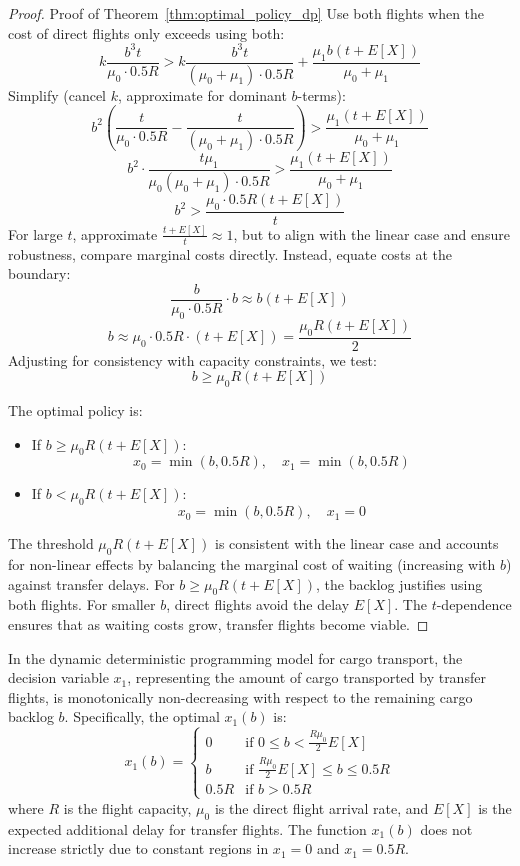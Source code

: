 \documentclass[opre,sglanonrev]{informs4}
\begin{document}
\begin{proof}{Proof of Theorem~\ref{thm:optimal_policy_dp}}
Use both flights when the cost of direct flights only exceeds using both:
\[
k \frac{b^3 t}{\mu_0 \cdot 0.5R} > k \frac{b^3 t}{(\mu_0 + \mu_1) \cdot 0.5R} + \frac{\mu_1 b (t + E[X])}{\mu_0 + \mu_1}
\]
Simplify (cancel \( k \), approximate for dominant \( b \)-terms):
\[
b^2 \left( \frac{t}{\mu_0 \cdot 0.5R} - \frac{t}{(\mu_0 + \mu_1) \cdot 0.5R} \right) > \frac{\mu_1 (t + E[X])}{\mu_0 + \mu_1}
\]
\[
b^2 \cdot \frac{t \mu_1}{\mu_0 (\mu_0 + \mu_1) \cdot 0.5R} > \frac{\mu_1 (t + E[X])}{\mu_0 + \mu_1}
\]
\[
b^2 > \frac{\mu_0 \cdot 0.5R (t + E[X])}{t}
\]
For large \( t \), approximate \( \frac{t + E[X]}{t} \approx 1 \), but to align with the linear case and ensure robustness, compare marginal costs directly. Instead, equate costs at the boundary:
\[
\frac{b}{\mu_0 \cdot 0.5R} \cdot b \approx b (t + E[X])
\]
\[
b \approx \mu_0 \cdot 0.5R \cdot (t + E[X]) = \frac{\mu_0 R (t + E[X])}{2}
\]
Adjusting for consistency with capacity constraints, we test:
\[
b \geq \mu_0 R (t + E[X])
\]

The optimal policy is:
\begin{itemize}
    \item If \( b \geq \mu_0 R (t + E[X]) \):
    \[
    x_0 = \min(b, 0.5R), \quad x_1 = \min(b, 0.5R)
    \]
    \item If \( b < \mu_0 R (t + E[X]) \):
    \[
    x_0 = \min(b, 0.5R), \quad x_1 = 0
    \]
\end{itemize}

The threshold \( \mu_0 R (t + E[X]) \) is consistent with the linear case and accounts for non-linear effects by balancing the marginal cost of waiting (increasing with \( b \)) against transfer delays. For \( b \geq \mu_0 R (t + E[X]) \), the backlog justifies using both flights. For smaller \( b \), direct flights avoid the delay \( E[X] \). The \( t \)-dependence ensures that as waiting costs grow, transfer flights become viable.
\end{proof}

\begin{proposition}
\label{prop:monotonic_x1}
In the dynamic deterministic programming model for cargo transport, the decision variable \( x_1 \), representing the amount of cargo transported by transfer flights, is monotonically non-decreasing with respect to the remaining cargo backlog \( b \). Specifically, the optimal \( x_1(b) \) is:
\[
x_1(b) = \begin{cases} 
0 & \text{if } 0 \leq b < \frac{R \mu_0}{2} E[X] \\
b & \text{if } \frac{R \mu_0}{2} E[X] \leq b \leq 0.5R \\
0.5R & \text{if } b > 0.5R
\end{cases}
\]
where \( R \) is the flight capacity, \( \mu_0 \) is the direct flight arrival rate, and \( E[X] \) is the expected additional delay for transfer flights. The function \( x_1(b) \) does not increase strictly due to constant regions in \( x_1 = 0 \) and \( x_1 = 0.5R \).
\end{proposition}
\end{document}
